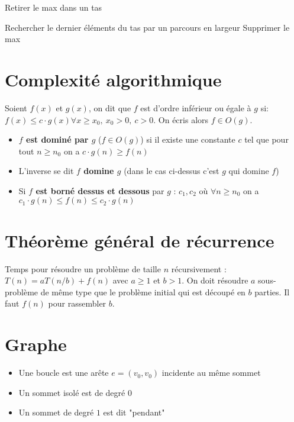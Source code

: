 \documentclass[11pt,a4paper]{report}
\begin{document}
\begin{algorithm}[H]
\caption{Retirer le max dans un tas}
Rechercher le dernier éléments du tas par un parcours en largeur\;
Supprimer le max\;
\end{algorithm}

\section{Complexité algorithmique}

Soient $f(x)$ et $g(x)$, on dit que $f$ est d'ordre inférieur ou égale à $g$ si: $f(x) \leq c\cdot g(x) \forall x \geq x_0,\ x_0>0,\ c > 0$. On écris alors $f\in O(g)$.
\begin{itemize}
    \item \textbf{$f$ est dominé par $g$} ($f\in O(g)$) si il existe une constante $c$ tel que pour tout $n\geq n_0$ on a $c\cdot g(n) \geq f(n)$
    \item L'inverse se dit \textbf{$f$ domine $g$} (dans le cas ci-dessus c'est $g$ qui domine $f$)
    \item Si \textbf{$f$ est borné dessus \textbf{et} dessous} par $g$ : $c_1,c_2$ où $\forall n \geq n_0$ on a $c_1\cdot g(n) \leq f(n) \leq c_2 \cdot g(n)$
\end{itemize}

\section{Théorème général de récurrence}
Temps pour résoudre un problème de taille $n$ récursivement : $T(n) = aT(n/b) + f(n)$ avec $a\geq 1$ et $b > 1$. On doit résoudre $a$ sous-problème de même type que le problème initial qui est découpé en $b$ parties. Il faut $f(n)$ pour rassembler $b$.

\section{Graphe}

\begin{itemize}
    \item Une boucle est une arête $e=(v_0,v_0)$ incidente au même sommet
    \item Un sommet isolé est de degré $0$
    \item Un sommet de degré $1$ est dit "pendant"
\end{itemize}
\end{document}

